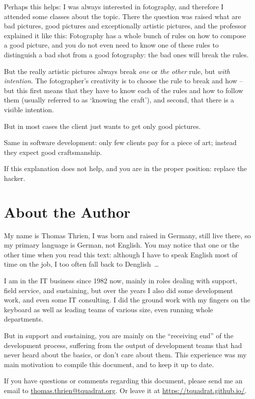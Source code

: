 \documentclass[11pt,a4paper, titlepage, parskip=half, headsepline, footsepline, cleardoublepage=current, headheight=1cm]{scrbook}
\begin{document}
Perhaps this helps: I was always interested in fotography, and therefore I attended some classes about the topic. There the question was raised what are bad pictures, good pictures and exceptionally artistic pictures, and the professor explained it like this: Fotography has a whole bunch of rules on how to compose a good picture, and you do not even need to know one of these rules to distinguish a bad shot from a good fotography: the bad ones will break the rules.

But the really artistic pictures always break \textit{one} or \textit{the other} rule, but \textit{with intention}. The fotographer's creativity is to choose the rule to break and how – but this first means that they have to know each of the rules and how to follow them (usually referred to as ‘knowing the craft’), and second, that there is a visible intention.

But in most cases the client just wants to get only good pictures.

Same in software development: only few clients pay for a piece of art; instead they expect good craftsmanship.

If this explanation does not help, and you are in the proper position: replace the hacker.

\section{About the Author}
My name is Thomas Thrien, I was born and raised in Germany, still live there, so my primary language is German, not English. You may notice that one or the other time when you read this text: although I have to speak English most of time on the job, I too often fall back to Denglish~…

I am in the IT business since 1982 now, mainly in roles dealing with support, field service, and sustaining, but over the years I also did some development work, and even some IT consulting. I did the ground work with my fingers on the keyboard as well as leading teams of various size, even running whole departments.

But in support and sustaining, you are mainly on the “receiving end” of the development process, suffering from the output of development teams that had never heard about the basics, or don't care about them. This experience was my main motivation to compile this document, and to keep it up to date.
 
If you have questions or comments regarding this document, please send me an email to \href{mailto:thomas.thrien@tquadrat.org}{thomas.thrien@tquadrat.org}. Or leave it at \url{https://tquadrat.github.io/}.
\end{document}
